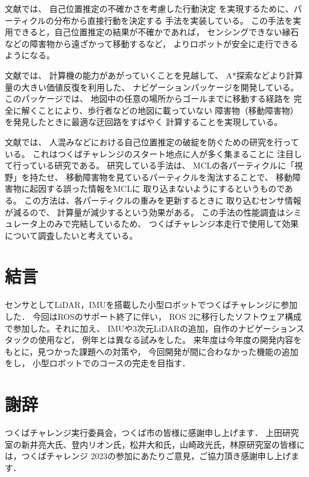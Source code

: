 \documentclass[twocolumn,9pt]{jsproceedings}
\begin{document}
文献\cite{上田2023}では、
自己位置推定の不確かさを考慮した行動決定
を実現するために、パーティクルの分布から直接行動を決定する
手法を実装している。
この手法を実用できると，自己位置推定の結果が不確かであれば，
センシングできない縁石などの障害物から遠ざかって移動するなど，
よりロボットが安全に走行できるようになる。

文献\cite{tonouchi2023}\cite{ueda2023JRM}では、
計算機の能力があがっていくことを見越して、
A*探索などより計算量の大きい価値反復を利用した、
ナビゲーションパッケージを開発している。
このパッケージでは、
地図中の任意の場所からゴールまでに移動する経路を
完全に解くことにより、歩行者などの地図に載っていない
障害物（移動障害物）を発見したときに最適な迂回路をすばやく
計算することを実現している。



文献\cite{ikebeMECH}では、
人混みなどにおける自己位置推定の破綻を防ぐための研究を行っている。
これはつくばチャレンジのスタート地点に人が多く集まることに
注目して行っている研究である。
研究している手法は、
MCLの各パーティクルに「視野」を持たせ、
移動障害物を見ているパーティクルを淘汰することで、
移動障害物に起因する誤った情報をMCLに
取り込まないようにするというものである。
この方法は、各パーティクルの重みを更新するときに
取り込むセンサ情報が減るので、
計算量が減少するという効果がある。
この手法の性能調査はシミュレータ上のみで完結しているため、
つくばチャレンジ本走行で使用して効果について調査したいと考えている。


\section{結言}
センサとしてLiDAR，IMUを搭載した小型ロボットでつくばチャレンジに参加した．
今回はROSのサポート終了に伴い，
ROS 2に移行したソフトウェア構成で参加した。それに加え、
IMUや3次元LiDARの追加，自作のナビゲーションスタックの使用など，
例年とは異なる試みをした。
来年度は今年度の開発内容をもとに，見つかった課題への対策や，
今回開発が間に合わなかった機能の追加をし，
小型ロボットでのコースの完走を目指す．


\section*{謝辞}
つくばチャレンジ実行委員会，つくば市の皆様に感謝申し上げます．
上田研究室の新井亮大氏、登内リオン氏，松井大和氏，山崎政光氏，林原研究室の皆様には，つくばチャレンジ 2023の参加にあたりご意見，ご協力頂き感謝申し上げます．
\end{document}
